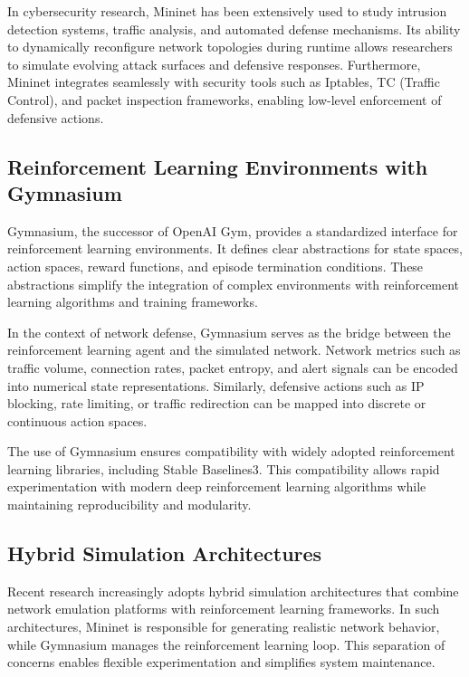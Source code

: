 \documentclass[12pt,a4paper]{report}
\begin{document}
In cybersecurity research, Mininet has been extensively used to study intrusion detection systems, traffic analysis, and automated defense mechanisms.
Its ability to dynamically reconfigure network topologies during runtime allows researchers to simulate evolving attack surfaces and defensive responses.
Furthermore, Mininet integrates seamlessly with security tools such as Iptables, TC (Traffic Control), and packet inspection frameworks, enabling low-level enforcement of defensive actions.

\subsection{Reinforcement Learning Environments with Gymnasium}

Gymnasium, the successor of OpenAI Gym, provides a standardized interface for reinforcement learning environments.
It defines clear abstractions for state spaces, action spaces, reward functions, and episode termination conditions.
These abstractions simplify the integration of complex environments with reinforcement learning algorithms and training frameworks.

In the context of network defense, Gymnasium serves as the bridge between the reinforcement learning agent and the simulated network.
Network metrics such as traffic volume, connection rates, packet entropy, and alert signals can be encoded into numerical state representations.
Similarly, defensive actions such as IP blocking, rate limiting, or traffic redirection can be mapped into discrete or continuous action spaces.

The use of Gymnasium ensures compatibility with widely adopted reinforcement learning libraries, including Stable Baselines3.
This compatibility allows rapid experimentation with modern deep reinforcement learning algorithms while maintaining reproducibility and modularity.

\subsection{Hybrid Simulation Architectures}

Recent research increasingly adopts hybrid simulation architectures that combine network emulation platforms with reinforcement learning frameworks.
In such architectures, Mininet is responsible for generating realistic network behavior, while Gymnasium manages the reinforcement learning loop.
This separation of concerns enables flexible experimentation and simplifies system maintenance.
\end{document}

